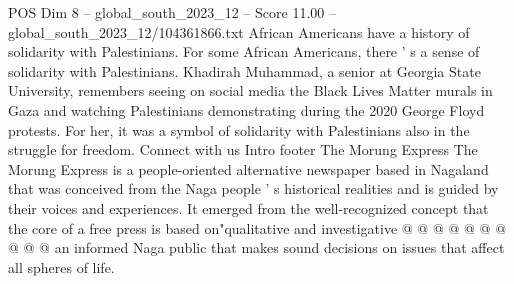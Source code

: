 \begin{textsample}{POS Dim 8 – global\_south\_2023\_12 – Score 11.00 – global\_south\_2023\_12/104361866.txt}
African Americans have a history of solidarity with Palestinians.
For some African Americans, there ' s a sense of solidarity with Palestinians.
Khadirah Muhammad, a senior at Georgia State University, remembers seeing on social media the Black Lives Matter murals in Gaza and watching Palestinians demonstrating during the 2020 George Floyd protests.
For her, it was a symbol of solidarity with Palestinians also in the struggle for freedom.
Connect with us Intro footer The Morung Express The Morung Express is a people-oriented alternative newspaper based in Nagaland that was conceived from the Naga people ' s historical realities and is guided by their voices and experiences.
It emerged from the well-recognized concept that the core of a free press is based on"qualitative and investigative @ @ @ @ @ @ @ @ @ @ an informed Naga public that makes sound decisions on issues that affect all spheres of life.

\end{textsample}
